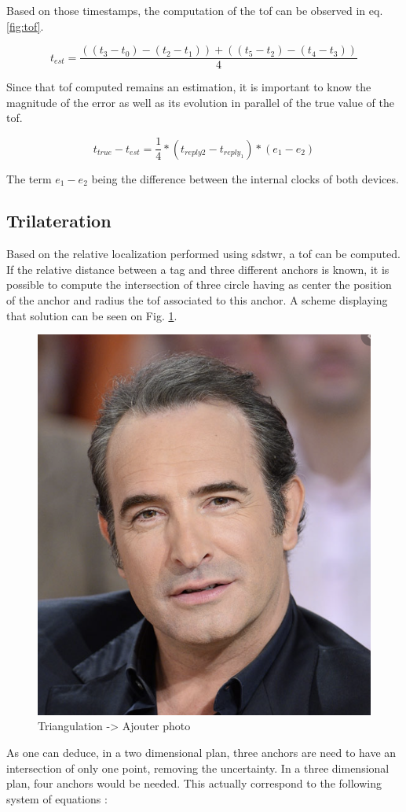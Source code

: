 Based on those timestamps, the computation of the \gls{tof} can be observed in eq. \ref{fig:tof}.

\begin{equation}
	t_{est} = \frac{((t_3 - t_0) - (t_2 - t_1)) + ((t_5 - t_2) - (t_4 - t_3))}{4}
\label{fig:tof}
\end{equation}

Since that \gls{tof} computed remains an estimation, it is important to know the magnitude of the error as well as its evolution in parallel of the true value of the \gls{tof}.

\begin{equation}
	t_{true} - t_{est} = \frac{1}{4}*(t_{reply2} - t_{reply_1})*(e_1 - e_2)
\end{equation}

The term $e_1 - e_2$ being the difference between the internal clocks of both devices. \cite{dalce2011comparison}

\subsection{Trilateration}
\label{tril}

Based on the relative localization performed using \gls{sdstwr}, a \gls{tof} can be computed. If the relative distance between a tag and three different anchors is known, it is possible to compute the intersection of three circle having as center the position of the anchor and radius the \gls{tof} associated to this anchor. A scheme displaying that solution can be seen on Fig. \ref{fig:triangulation}.

\begin{figure}[H]
\centering
\includegraphics[width=.2\linewidth]{Images/Temporary_pic.png}
\caption{Triangulation -> Ajouter photo}
\label{fig:triangulation}
\end{figure}

As one can deduce, in a two dimensional  plan, three anchors are need to have an intersection of only one point, removing the uncertainty. In a three dimensional plan, four anchors would be needed. This actually correspond to 
the following system of equations :

